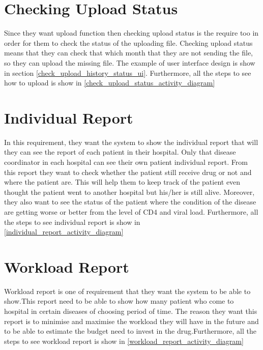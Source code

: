 \section{Checking Upload Status}
    Since they want upload function then checking upload status is the require too in order for them to check the status of the uploading file. Checking upload status means that they can check that which month that they are not sending the file, so they can upload the missing file. The example of user interface design is show in section \ref{check_upload_history_status_ui}. Furthermore, all the steps to see how to upload is show in \ref{check_upload_status_activity_diagram}
    
\section{Individual Report}
    In this requirement, they want the system to show the individual report that will they can see the report of each patient in their hospital. Only that disease coordinator in each hospital can see their own patient individual report. From this report they want to check whether the patient still receive drug or not and where the patient are. This will help them to keep track of the patient even thought the patient went to another hospital but his/her is still alive. Moreover, they also want to see the status of the patient where the condition of the disease are getting worse or better from the level of CD4 and viral load. Furthermore, all the steps to see individual report is show in \ref{individual_report_activity_diagram}
    
\section{Workload Report}
    Workload report is one of requirement that they want the system to be able to show.This report need to be able to show how many patient who come to hospital in certain diseases of choosing period of time. The reason they want this report is to minimise and maximise the workload they will have in the future and to be able to estimate the budget need to invest in the drug.Furthermore, all the steps to see workload report is show in \ref{workload_report_activity_diagram}